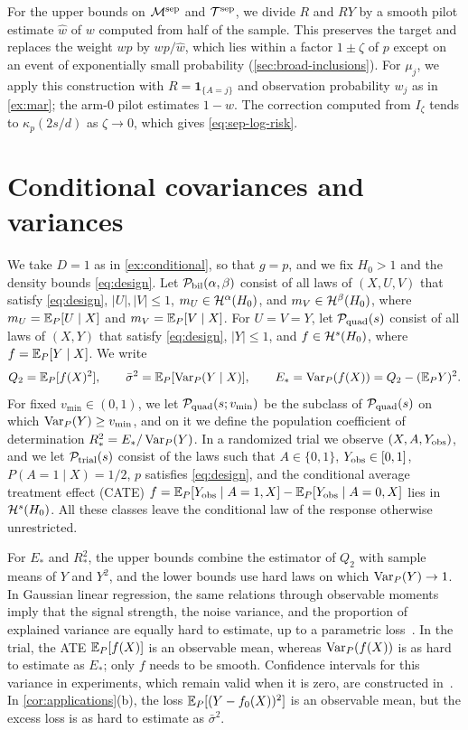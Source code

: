 For the upper bounds on $\mathcal M^{\rm sep}$ and
$\mathcal T^{\rm sep}$, we divide $R$ and $RY$ by a smooth pilot
estimate $\widehat w$ of $w$ computed from half of the sample. This
preserves the target and replaces the weight $wp$ by $wp/\widehat w$,
which lies within a factor $1\pm\zeta$ of $p$ except on an event of
exponentially small probability (\cref{sec:broad-inclusions}).
For $\mu_j$, we apply this construction with $R=\mathbf 1_{\{A=j\}}$ and
observation probability $w_j$ as in \cref{ex:mar}; the arm-$0$
pilot estimates $1-w$. The correction computed from $I_\zeta$ tends to
$\kappa_p(2s/d)$ as $\zeta\to0$, which gives \eqref{eq:sep-log-risk}.

\section{Conditional covariances and variances}\label{sec:product-class}

We take $D=1$ as in \cref{ex:conditional}, so that $g=p$, and we
fix $H_0>1$ and the density bounds \eqref{eq:design}. Let
$\mathcal P_{\rm bil}(\alpha,\beta)$ consist of all laws of $(X,U,V)$ that
satisfy \eqref{eq:design}, $|U|,|V|\le1$, $m_U\in\mathcal H^\alpha(H_0)$, and
$m_V\in\mathcal H^\beta(H_0)$, where $m_U=\mathbb E_P[U\mid X]$ and
$m_V=\mathbb E_P[V\mid X]$. For $U=V=Y$, let $\mathcal P_{\rm quad}(s)$ consist of all
laws of $(X,Y)$ that satisfy \eqref{eq:design}, $|Y|\le1$, and
$f\in\mathcal H^s(H_0)$, where $f=\mathbb E_P[Y\mid X]$. We write
\[
 Q_2=\mathbb E_P[f(X)^2],\qquad \bar\sigma^2=\mathbb E_P[\operatorname{Var}_P(Y\mid X)],\qquad
 E_*=\operatorname{Var}_P(f(X))=Q_2-(\mathbb E_PY)^2 .
\]
For fixed $v_{\min}\in(0,1)$, we let $\mathcal P_{\rm quad}(s;v_{\min})$ be the
subclass of $\mathcal P_{\rm quad}(s)$ on which $\operatorname{Var}_P(Y)\ge v_{\min}$, and on
it we define the population coefficient of determination
$R_*^2=E_*/\operatorname{Var}_P(Y)$. In a randomized trial we observe
$(X,A,Y_{\rm obs})$, and we let $\mathcal P_{\rm trial}(s)$ consist of the laws
such that $A\in\{0,1\}$, $Y_{\rm obs}\in[0,1]$, $P(A=1\mid X)=1/2$, $p$
satisfies \eqref{eq:design}, and the conditional average treatment
effect (CATE)
$f=\mathbb E_P[Y_{\rm obs}\mid A=1,X]-\mathbb E_P[Y_{\rm obs}\mid A=0,X]$ lies in
$\mathcal H^s(H_0)$. All these classes leave the conditional law of the
response otherwise unrestricted.

For $E_*$ and $R_*^2$, the upper bounds combine the estimator of $Q_2$
with sample means of $Y$ and $Y^2$, and the lower bounds use hard laws
on which $\operatorname{Var}_P(Y)\to1$. In Gaussian linear regression, the same
relations through observable moments imply that the signal strength,
the noise variance, and the proportion of explained variance are equally
hard to estimate, up to a parametric
loss~\cite[Section~1.1]{verzelengassiat2018}. In the trial, the ATE
$\mathbb E_P[f(X)]$ is an observable mean, whereas $\operatorname{Var}_P(f(X))$ is as hard to
estimate as $E_*$; only $f$ needs to be smooth. Confidence intervals for
this variance in experiments, which remain valid when it is zero, are
constructed in~\cite{sanchezbecerra2023}. In \cref{cor:applications}(b),
the loss $\mathbb E_P[(Y-f_0(X))^2]$ is an observable mean, but the excess loss
is as hard to estimate as $\bar\sigma^2$.

